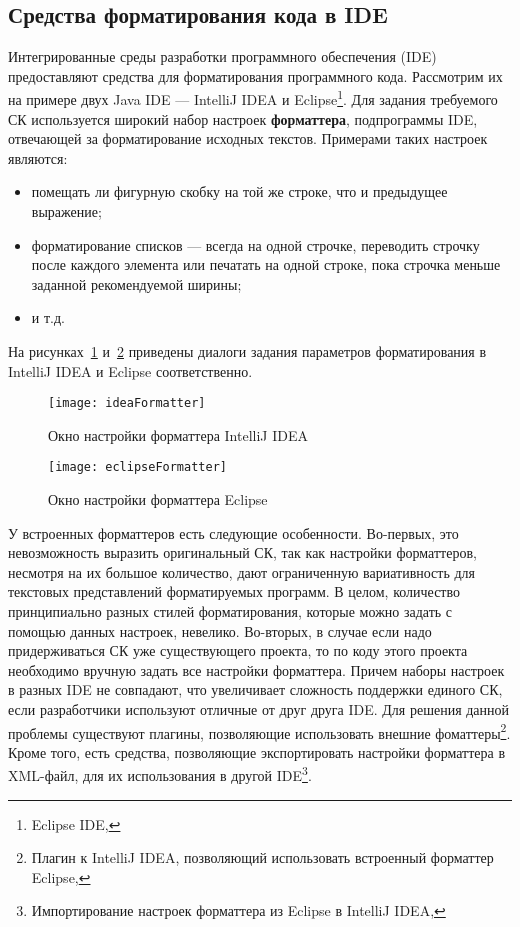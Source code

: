 \newpage
\subsection{Средства форматирования кода в IDE}

Интегрированные среды разработки программного обеспечения
(IDE) предоставляют средства
для форматирования программного кода. Рассмотрим их на примере двух Java IDE ---
IntelliJ IDEA и Eclipse\footnote{Eclipse IDE, }.
Для задания требуемого СК используется широкий набор настроек \textbf{форматтера},
подпрограммы IDE, отвечающей за форматирование исходных текстов.
Примерами таких настроек являются:
\begin{itemize}
  \item помещать ли фигурную скобку на той же строке, что и
    предыдущее выражение;
  \item форматирование списков --- всегда на одной строчке, переводить строчку после
    каждого элемента или печатать на одной строке,
    пока строчка меньше заданной рекомендуемой ширины;
  \item и т.д.
\end{itemize}
На рисунках~\ref{fig:ideaFormatter} и~\ref{fig:eclipseFormatter} приведены диалоги задания
параметров форматирования в IntelliJ IDEA и Eclipse соответственно.

\begin{figure}[p]
	\centering
	\texttt{[image: ideaFormatter]}
	\caption{Окно настройки форматтера IntelliJ IDEA}
	\label{fig:ideaFormatter}
\end{figure}

\begin{figure}[p]
	\centering
	\texttt{[image: eclipseFormatter]}
	\caption{Окно настройки форматтера Eclipse}
	\label{fig:eclipseFormatter}
\end{figure}

У встроенных форматтеров есть следующие особенности.
Во-первых, это невозможность выразить
оригинальный СК, так как настройки форматтеров, несмотря на их большое
количество,
дают ограниченную вариативность для текстовых представлений форматируемых
программ. В целом, количество принципиально разных
стилей форматирования, которые можно задать с помощью данных настроек,
невелико.
Во-вторых, в случае если надо
придерживаться СК уже существующего проекта, то по коду этого проекта необходимо
вручную задать все настройки форматтера.
Причем наборы настроек в разных IDE не совпадают, что увеличивает сложность
поддержки единого СК, если разработчики используют отличные от друг друга IDE.
Для решения данной проблемы существуют плагины, позволяющие использовать
внешние фоматтеры\footnote{Плагин к IntelliJ IDEA, позволяющий использовать
встроенный форматтер Eclipse, }.
Кроме того, есть средства, позволяющие экспортировать настройки форматтера в
XML-файл, для их использования в другой
IDE\footnote{Импортирование настроек форматтера из Eclipse в IntelliJ IDEA,
}.

